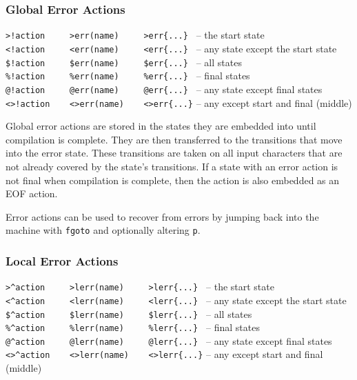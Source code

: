 \documentclass[letterpaper,11pt,oneside]{book}
\begin{document}
\subsubsection{Global Error Actions}

\hspace*{24pt}\verb|>!action     >err(name)     >err{...} | -- the start state\\
\hspace*{24pt}\verb|<!action     <err(name)     <err{...} | -- any state except the start state\\
\hspace*{24pt}\verb|$!action     $err(name)     $err{...} | -- all states\\
\hspace*{24pt}\verb|%!action     %err(name)     %err{...} | -- final states\\
\hspace*{24pt}\verb|@!action     @err(name)     @err{...} | -- any state except final states\\
\hspace*{24pt}\verb|<>!action    <>err(name)    <>err{...}| -- any except start and final (middle)
\vspace{12pt}

Global error actions are stored in the states they are embedded into until
compilation is complete. They are then transferred to the transitions that move
into the error state. These transitions are taken on all input characters that
are not already covered by the state's transitions. If a state with an error
action is not final when compilation is complete, then the action is also
embedded as an EOF action.

Error actions can be used to recover from errors by jumping back into the
machine with \verb|fgoto| and optionally altering \verb|p|.

\subsubsection{Local Error Actions}

\hspace*{24pt}\verb|>^action     >lerr(name)     >lerr{...} | -- the start state\\
\hspace*{24pt}\verb|<^action     <lerr(name)     <lerr{...} | -- any state except the start state\\
\hspace*{24pt}\verb|$^action     $lerr(name)     $lerr{...} | -- all states\\
\hspace*{24pt}\verb|%^action     %lerr(name)     %lerr{...} | -- final states\\
\hspace*{24pt}\verb|@^action     @lerr(name)     @lerr{...} | -- any state except final states\\
\hspace*{24pt}\verb|<>^action    <>lerr(name)    <>lerr{...}| -- any except start and final (middle)
\vspace{12pt}
\end{document}
